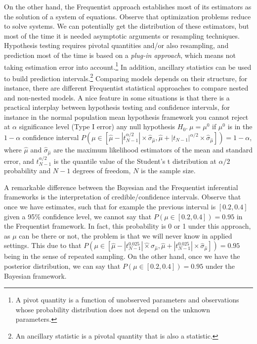 On the other hand, the Frequentist approach establishes most of its estimators as the solution of a system of equations. Observe that optimization problems reduce to solve systems. We can potentially get the distribution of these estimators, but most of the time it is needed asymptotic arguments or resampling techniques. Hypothesis testing requires pivotal quantities and/or also resampling, and prediction most of the time is based on a \textit{plug-in approach}, which means not taking estimation error into account.\footnote{A pivot quantity is a function of unobserved parameters and observations whose probability distribution does not depend on the unknown parameters.} In addition, ancillary statistics can be used to build prediction intervals.\footnote{An ancillary statistic is a pivotal quantity that is also a statistic.} Comparing models depends on their structure, for instance, there are different Frequentist statistical approaches to compare nested and non-nested models. A nice feature in some situations is that there is a practical interplay between hypothesis testing and confidence intervals, for instance in the normal population mean hypothesis framework you cannot reject at $\alpha$ significance level (Type I error) any null hypothesis $H_0. \  \mu=\mu^0$ if $\mu^0$ is in the $1-\alpha$ confidence interval $P(\mu\in[\hat{\mu}-|t_{N-1}^{\alpha/2}|\times\hat \sigma_{\hat{\mu}},\hat{\mu}+|t_{N-1}|^{\alpha/2}\times \hat\sigma_{\hat{\mu}}])=1-\alpha$, where $\hat{\mu}$ and $\hat\sigma_{\hat{\mu}}$ are the maximum likelihood estimators of the mean and standard error, and $t_{N-1}^{\alpha/2}$ is the quantile value of the Student's t distribution at $\alpha/2$ probability and $N-1$ degrees of freedom, $N$ is the sample size.

A remarkable difference between the Bayesian and the Frequentist inferential frameworks is the interpretation of credible/confidence intervals. Observe that once we have estimates, such that for example the previous interval is $[0.2, 0.4]$ given a 95\% confidence level, we cannot say that $P(\mu\in [0.2, 0.4])=0.95$ in the Frequentist framework. In fact, this probability is 0 or 1 under this approach, as $\mu$ can be there or not, the problem is that we will never know in applied settings. This due to that $P(\mu\in[\hat{\mu}-|t_{N-1}^{0.025}|\hat\times \sigma_{\hat{\mu}},\hat{\mu}+|t_{N-1}^{0.025}|\times \hat\sigma_{\hat{\mu}}])=0.95$ being in the sense of repeated sampling. On the other hand, once we have the posterior distribution, we can say that $P(\mu\in [0.2, 0.4])=0.95$ under the Bayesian framework.      

